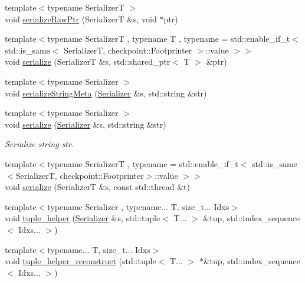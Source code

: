 \begin{DoxyCompactItemize}
\item 
{\footnotesize template$<$typename SerializerT $>$ }\\void \hyperlink{namespacecheckpoint_aaadeb0ab61d069afc8a97ec6b6dc630c}{serialize\+Raw\+Ptr} (SerializerT \&s, void $\ast$ptr)
\item 
{\footnotesize template$<$typename SerializerT , typename T , typename  = std\+::enable\+\_\+if\+\_\+t$<$    std\+::is\+\_\+same$<$      Serializer\+T,      checkpoint\+::\+Footprinter    $>$\+::value  $>$$>$ }\\void \hyperlink{namespacecheckpoint_aff1bebba5ce7fda79f83d2af8c859254}{serialize} (SerializerT \&s, std\+::shared\+\_\+ptr$<$ T $>$ \&ptr)
\item 
{\footnotesize template$<$typename Serializer $>$ }\\void \hyperlink{namespacecheckpoint_a1ea8e1ef9d0a10d26df77cb5309435aa}{serialize\+String\+Meta} (\hyperlink{structcheckpoint_1_1_serializer}{Serializer} \&s, std\+::string \&str)
\item 
{\footnotesize template$<$typename Serializer $>$ }\\void \hyperlink{namespacecheckpoint_aef8e8717e4cc129379525653730c4eba}{serialize} (\hyperlink{structcheckpoint_1_1_serializer}{Serializer} \&s, std\+::string \&str)
\begin{DoxyCompactList}\small\item\em Serialize string {\ttfamily str}. \end{DoxyCompactList}\item 
{\footnotesize template$<$typename SerializerT , typename  = std\+::enable\+\_\+if\+\_\+t$<$    std\+::is\+\_\+same$<$\+Serializer\+T, checkpoint\+::\+Footprinter$>$\+::value  $>$$>$ }\\void \hyperlink{namespacecheckpoint_ab9c05efe18a47d990fb20e84f73e9943}{serialize} (SerializerT \&s, const std\+::thread \&t)
\item 
{\footnotesize template$<$typename Serializer , typename... T, size\+\_\+t... Idxs$>$ }\\void \hyperlink{namespacecheckpoint_ab763d3ca9396ff9a1896f5da6c2b3c54}{tuple\+\_\+helper} (\hyperlink{structcheckpoint_1_1_serializer}{Serializer} \&s, std\+::tuple$<$ T... $>$ \&tup, std\+::index\+\_\+sequence$<$ Idxs... $>$)
\item 
{\footnotesize template$<$typename... T, size\+\_\+t... Idxs$>$ }\\void \hyperlink{namespacecheckpoint_a8370a2284f01f2fada353a096ab95f4d}{tuple\+\_\+helper\+\_\+reconstruct} (std\+::tuple$<$ T... $>$ $\ast$\&tup, std\+::index\+\_\+sequence$<$ Idxs... $>$)

\end{DoxyCompactItemize}
